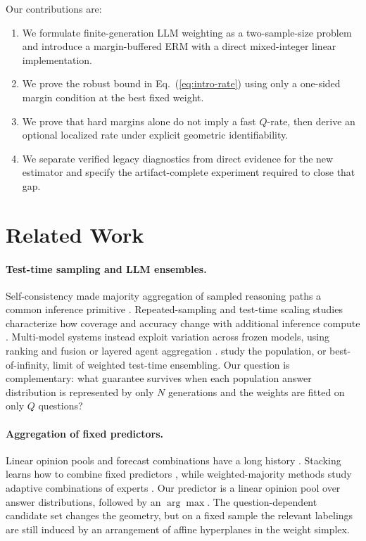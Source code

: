 Our contributions are:
\begin{enumerate}[leftmargin=*,itemsep=2pt,topsep=3pt]
\item We formulate finite-generation LLM weighting as a two-sample-size
problem and introduce a margin-buffered ERM with a direct mixed-integer linear
implementation.
\item We prove the robust bound in Eq.~(\ref{eq:intro-rate}) using only a
one-sided margin condition at the best fixed weight.
\item We prove that hard margins alone do not imply a fast \(Q\)-rate, then
derive an optional localized rate under explicit geometric identifiability.
\item We separate verified legacy diagnostics from direct evidence for the new
estimator and specify the artifact-complete experiment required to close that
gap.
\end{enumerate}

\section{Related Work}
\label{sec:related}

\paragraph{Test-time sampling and LLM ensembles.}
Self-consistency made majority aggregation of sampled reasoning paths a common
inference primitive \citep{wang2022selfconsistencyic}.  Repeated-sampling and
test-time scaling studies characterize how coverage and accuracy change with
additional inference compute \citep{brown2024largelm,schaeffer2025howdl,
snell2025scalinglt,wu2024inferencesl}.  Multi-model systems instead exploit
variation across frozen models, using ranking and fusion or layered agent
aggregation \citep{jiang2023llmblenderel,wang2024mixtureofagentsel}.
\citet{komiyama2026best} study the population, or best-of-infinity, limit of
weighted test-time ensembling.  Our question is complementary: what guarantee
survives when each population answer distribution is represented by only
\(N\) generations and the weights are fitted on only \(Q\) questions?

\paragraph{Aggregation of fixed predictors.}
Linear opinion pools and forecast combinations have a long history
\citep{stone1961opinionpool,bates1969combination,genest1986combining}.
Stacking learns how to combine fixed predictors
\citep{wolpert1992stacked,breiman1996stacked}, while weighted-majority methods
study adaptive combinations of experts \citep{littlestone1994weighted}.  Our
predictor is a linear opinion pool over answer distributions, followed by an
\(\arg\max\).  The question-dependent candidate set changes the geometry, but
on a fixed sample the relevant labelings are still induced by an arrangement
of affine hyperplanes in the weight simplex.

